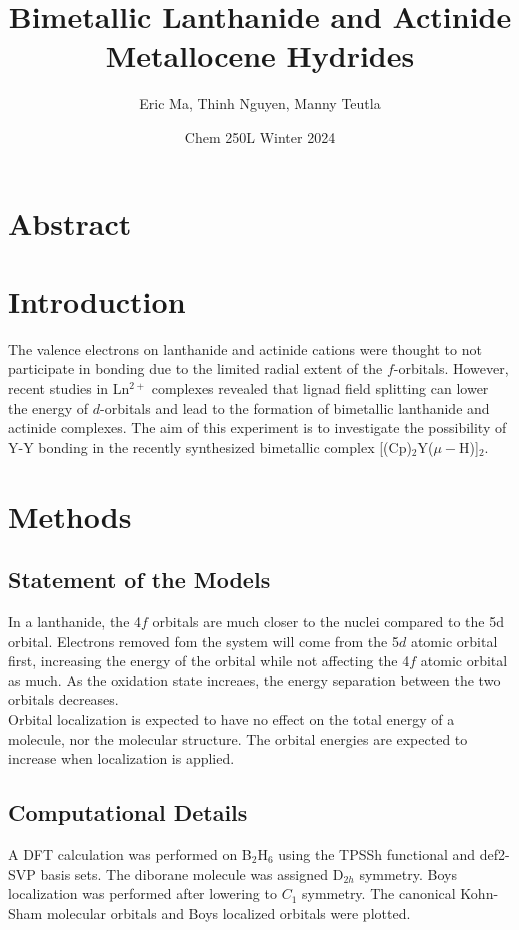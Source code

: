 \documentclass{article}
\title{Bimetallic Lanthanide and Actinide Metallocene Hydrides}
\author{Eric Ma, Thinh Nguyen, Manny Teutla}
\date{Chem 250L Winter 2024}
\begin{document}
\maketitle

\section{Abstract} %

\section{Introduction} %
The valence electrons on lanthanide and actinide cations were thought to not
participate in bonding due to the limited radial extent of the $f$-orbitals.
However, recent studies in Ln$^{2+}$ complexes revealed that lignad field
splitting can lower the energy of $d$-orbitals and lead to the formation of
bimetallic lanthanide and actinide complexes.  The aim of this experiment is to
investigate the possibility of Y-Y bonding in the recently synthesized
bimetallic complex [(Cp)$_2$Y($\mu - $H)]$_2$. \\

\section{Methods} %
\subsection{Statement of the Models} %
In a lanthanide, the 4$f$ orbitals are much closer to the nuclei compared to the
5d orbital. %
Electrons removed fom the system will come from the 5$d$ atomic orbital first,
increasing the energy of the orbital while not affecting the 4$f$ atomic orbital
as much.  As the oxidation state increaes, the energy separation between the two
orbitals decreases. \\ Orbital localization is expected to have no effect on the
total energy of a molecule, nor the molecular structure.  The orbital energies
are expected to increase when localization is applied.

\subsection{Computational Details}
A DFT calculation was performed on B$_2$H$_6$ using the TPSSh functional and
def2-SVP basis sets.  The diborane molecule was assigned D$_{2h}$ symmetry.
Boys localization was performed after lowering to $C_1$ symmetry.  The canonical
Kohn-Sham molecular orbitals and Boys localized orbitals were plotted.
\end{document}
